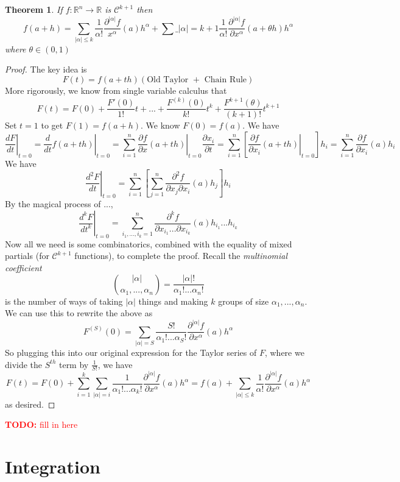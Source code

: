 \documentclass{article}
\newtheorem{theorem}{Theorem}
\newcommand{\reals}[0]{\mathbb{R}}
\newcommand{\mc}[1]{\mathcal{#1}}
\newcommand{\prt}[2]{\frac{\partial #1}{\partial #2}}
\newcommand{\TODO}[1]{\textcolor{red}{\textbf{TODO:} #1}}
\begin{document}
\begin{theorem}
  If \(f: \reals^n \to \reals\) is \(\mc{C}^{k + 1}\) then
  \[f(a + h) = \sum_{|\alpha| \leq k}\frac{1}{\alpha!}\frac{\partial^{|\alpha|}f}{x^\alpha}(a)h^\alpha + \sum\_{|\alpha| = k + 1}\frac{1}{\alpha!}\frac{\partial^{|\alpha|}f}{\partial x^\alpha}(a + \theta h)h^\alpha\]
  where \(\theta \in (0, 1)\)
\end{theorem}
\begin{proof}
  The key idea is
  \[F(t) = f(a + th)(\text{Old Taylor } + \text{ Chain Rule})\]
  More rigorously, we know from single variable calculus that
  \[F(t) = F(0) + \frac{F'(0)}{1!}t + ... + \frac{F^{(k)}(0)}{k!}t^k + \frac{F^{k + 1}(\theta)}{(k + 1)!}t^{k + 1}\]
  Set \(t = 1\) to get \(F(1) = f(a + h)\).
  We know \(F(0) = f(a)\). We have
  \[\left.\frac{dF}{dt}\right|_{t = 0} = \left.\frac{d}{dt}f(a + th)\right|_{t = 0} = \sum_{i = 1}^n\left.\prt{f}{x}(a + th)\right|_{t = 0}\prt{x_i}{t} = \sum_{i = 1}^n\left[\left.\prt{f}{x_i}(a + th)\right|_{t = 0}\right]h_i
  = \sum_{i = 1}^n\prt{f}{x_i}(a)h_i\]
  We have
  \[\left.\frac{d^2F}{dt}\right|_{t = 0} = \sum_{i = 1}^n\left[
    \sum_{j = 1}^n\frac{\partial^2f}{\partial x_j \partial x_i}(a)h_j
  \right]h_i\]
  By the magical process of ...,
  \[\left.\frac{d^kF}{dt^k}\right|_{t = 0} = \sum_{i_1,...,i_k = 1}^n\frac{\partial^kf}{\partial x_{i_1} ... \partial x_{i_k}}(a)h_{i_1}...h_{i_k}\]
  Now all we need is some combinatorics, combined with the equality of mixed partials (for \(\mc{C}^{k + 1}\) functions), to complete the proof. Recall the \textit{multinomial coefficient}
  \[{{|\alpha|} \choose {\alpha_1,...,\alpha_n}} = \frac{|\alpha|!}{\alpha_1!...\alpha_n!}\]
  is the number of ways of taking \(|\alpha|\) things and making \(k\) groups of size \(\alpha_1,...,\alpha_n\).
  We can use this to rewrite the above as
  \[F^{(S)}(0) = \sum_{|\alpha| = S}\frac{S!}{\alpha_1!...\alpha_S!}\frac{\partial^{|\alpha|}f}{\partial x^\alpha}(a)h^\alpha\]
  So plugging this into our original expression for the Taylor series of \(F\), where we divide the \(S^{th}\) term by \(\frac{1}{S!}\), we have
  \[F(t) = F(0) + \sum_{i = 1}^k\sum_{|\alpha| = i}\frac{1}{\alpha_1!...\alpha_k!}\frac{\partial^{|\alpha|}f}{\partial x^\alpha}(a)h^\alpha
  = f(a) + \sum_{|\alpha| \leq k}\frac{1}{\alpha!}\frac{\partial^{|\alpha|}f}{\partial x^\alpha}(a)h^\alpha\]
  as desired.

\end{proof}

\TODO{fill in here}

\section{Integration}
\end{document}
